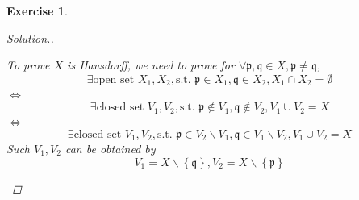 \documentclass{article}
\theoremstyle{breakstyle}
\newtheorem{exercise}{Exercise}
\newenvironment{solution}
  {\begin{proof}[Solution.]\renewcommand{\qedsymbol}{}}
  {\end{proof}}
\begin{document}
\begin{exercise}
\begin{solution}
\begin{enumerate}[label=({\roman*})]
                To prove $X$ is Hausdorff, we need to prove for $\forall \mathfrak{p},\mathfrak{q}\in X,\mathfrak{p}\neq \mathfrak{q}$,
                $$
                \exists \text{open set }X_1,X_2,\text{s.t. }
                \mathfrak{p}\in X_1,\mathfrak{q}\in X_2,X_1\cap X_2=\emptyset
                $$
                $\Leftrightarrow$ 
                $$
                \exists \text{closed set }V_1,V_2,\text{s.t. }\mathfrak{p}\not\in V_1,\mathfrak{q}\not\in V_2,V_1\cup V_2=X
                $$
                $\Leftrightarrow$ 
                $$
                \exists \text{closed set }V_1,V_2,\text{s.t. }\mathfrak{p}\in V_2\backslash V_1,\mathfrak{q}\in V_1\backslash V_2,V_1\cup V_2=X
                $$
                Such $V_1,V_2$ can be obtained by
                $$
                V_1=X\backslash \left\{ \mathfrak{q} \right\} ,V_2=X\backslash \left\{ \mathfrak{p} \right\}
                $$
        \end{enumerate}
\end{solution}
\end{exercise}
\end{document}
